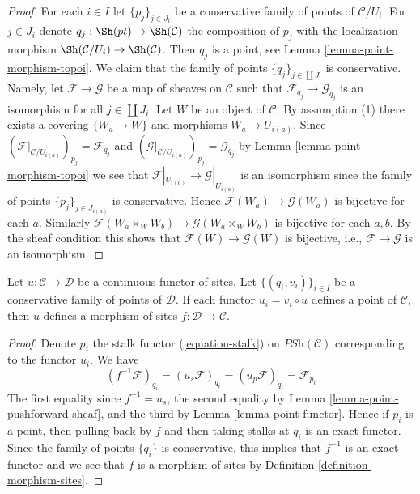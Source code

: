\begin{proof}
For each $i \in I$ let $\{p_j\}_{j \in J_i}$ be a conservative
family of points of $\mathcal{C}/U_i$. For $j \in J_i$ denote
$q_j : \Sh(pt) \to \Sh(\mathcal{C})$ the composition
of $p_j$ with the localization morphism
$\Sh(\mathcal{C}/U_i) \to \Sh(\mathcal{C})$.
Then $q_j$ is a point, see
Lemma \ref{lemma-point-morphism-topoi}.
We claim that the family of points $\{q_j\}_{j \in \coprod J_i}$
is conservative.
Namely, let $\mathcal{F} \to \mathcal{G}$ be a map of sheaves
on $\mathcal{C}$ such that $\mathcal{F}_{q_j} \to \mathcal{G}_{q_j}$
is an isomorphism for all $j \in \coprod J_i$.
Let $W$ be an object of $\mathcal{C}$.
By assumption (1) there exists a covering $\{W_a \to W\}$ and
morphisms $W_a \to U_{i(a)}$.
Since $(\mathcal{F}|_{\mathcal{C}/U_{i(a)}})_{p_j} = \mathcal{F}_{q_j}$
and $(\mathcal{G}|_{\mathcal{C}/U_{i(a)}})_{p_j} = \mathcal{G}_{q_j}$ by
Lemma \ref{lemma-point-morphism-topoi}
we see that
$\mathcal{F}|_{U_{i(a)}} \to \mathcal{G}|_{U_{i(a)}}$ is an isomorphism
since the family of points $\{p_j\}_{j \in J_{i(a)}}$ is conservative.
Hence $\mathcal{F}(W_a) \to \mathcal{G}(W_a)$ is bijective for each $a$.
Similarly $\mathcal{F}(W_a \times_W W_b) \to \mathcal{G}(W_a \times_W W_b)$
is bijective for each $a, b$.
By the sheaf condition this shows that
$\mathcal{F}(W) \to \mathcal{G}(W)$ is bijective, i.e.,
$\mathcal{F} \to \mathcal{G}$ is an isomorphism.
\end{proof}

\begin{lemma}
\label{lemma-check-morphism-sites}
Let $u : \mathcal{C} \to \mathcal{D}$ be a continuous functor of sites.
Let $\{(q_i, v_i)\}_{i\in I}$ be a conservative family of points of
$\mathcal{D}$. If each functor $u_i = v_i \circ u$ defines
a point of $\mathcal{C}$,
then $u$ defines a morphism of sites $f : \mathcal{D} \to \mathcal{C}$.
\end{lemma}

\begin{proof}
Denote $p_i$ the stalk functor (\ref{equation-stalk}) on
$\textit{PSh}(\mathcal{C})$ corresponding to the functor $u_i$. We have
$$
(f^{-1}\mathcal{F})_{q_i} =
(u_s\mathcal{F})_{q_i} =
(u_p\mathcal{F})_{q_i} =
\mathcal{F}_{p_i}
$$
The first equality since $f^{-1} = u_s$, the second equality
by Lemma \ref{lemma-point-pushforward-sheaf}, and the third
by Lemma \ref{lemma-point-functor}.
Hence if $p_i$ is a point, then pulling back by $f$
and then taking stalks at $q_i$ is an exact functor.
Since the family of points $\{q_i\}$ is conservative, this
implies that $f^{-1}$ is an exact functor and we see
that $f$ is a morphism of sites by Definition \ref{definition-morphism-sites}.
\end{proof}





